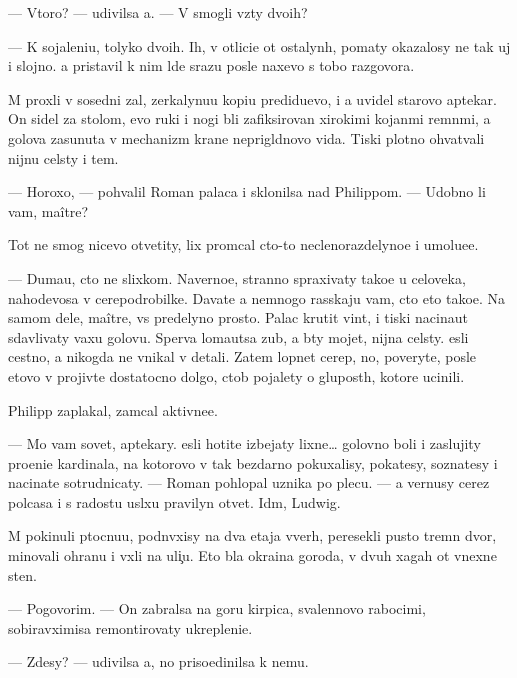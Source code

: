 \documentclass[10pt]{book}
\begin{document}
— Vtoro{\y}? — udivilsa {\y}a. — V{\yi} smogli vz{\ia}ty dvo{\y}ih?

— K sojaleni{\y}u, tolyko dvo{\y}ih. Ih, v otlici{\y}e ot ostalyn{\yi}h, po{\y}maty okazalosy ne tak uj i slojno. {\Y}a pristavil k nim l{\io}de{\y} srazu posle naxevo s tobo{\y} razgovora.

M{\yi} proxli v sosedni{\y} zal, zerkalynu{\y}u kopi{\y}u predidu{\x}evo, i {\y}a uvidel starovo aptekar{\ia}. On sidel za stolom, {\y}evo ruki i nogi b{\yi}li zafiksirovan{\yi} xirokimi kojan{\yi}mi remn{\ia}mi, a golova zasunuta v mechanizm kra{\y}ne neprigl{\ia}dnovo vida. Tiski plotno ohvat{\yi}vali nijn{\io}{\y}u cel{\io}sty i tem{\ia}.

— Horoxo, — pohvalil Roman palaca i sklonilsa nad Philippom. — Udobno li vam, maître?

Tot ne smog nicevo otvetity, lix prom{\yi}cal cto-to neclenorazdelyno{\y}e i umo\-l{\ia}\-{\y}u\-{\x}e\-{\y}e.

— Duma{\y}u, cto ne slixkom. Naverno{\y}e, stranno spraxivaty tako{\y}e u celoveka, nahod{\ia}{\x}evosa v cerepodrobilke. Dava{\y}te {\y}a nemnogo rasskaju vam, cto eto tako{\y}e. Na samom dele, maître, vs{\e} predelyno prosto. Palac krutit vint, i tiski nacina{\y}ut sdavlivaty vaxu golovu. Sperva loma{\y}utsa zub{\yi}, a b{\yi}ty mojet, nijn{\ia}{\y}a cel{\io}sty. {\Y}esli cestno, {\y}a nikogda ne vnikal v detali. Zatem lopnet cerep, no, poveryte, posle etovo v{\yi} projiv{\e}te dostatocno dolgo, ctob{\yi} pojalety o glupost{\ia}h, ko\-to\-r{\yi}\-{\y}e ucinili.

Philipp zaplakal, zam{\yi}cal aktivne{\y}e.

— Mo{\y} vam sovet, aptekary. {\Y}esli hotite izbejaty lixne{\y}… golovno{\y} boli i zaslujity pro{\x}eni{\y}e kardinala, na kotorovo v{\yi} tak bezdarno pokuxalisy, poka{\y}tesy, sozna{\y}tesy i nacina{\y}te sotrudnicaty. — Roman pohlopal uznika po plecu. — {\Y}a vernusy cerez polcasa i s radost{\y}u usl{\yi}xu pravilyn{\yi}{\y} otvet. Id{\e}m, Ludwig.

M{\yi} pokinuli p{\yi}tocnu{\y}u, podn{\ia}vxisy na dva etaja vverh, peresekli pusto{\y} t{\io}rem\-n{\yi}{\y} dvor, minovali ohranu i v{\yi}xli na uli{\c}u. Eto b{\yi}la okra{\y}ina go\-ro\-da, v dvuh xagah ot vnexne{\y} sten{\yi}.

— Pogovorim. — On zabralsa na goru kirpica, svalennovo rabocimi, sobiravximisa remontirovaty ukrepleni{\y}e.

— Zdesy? — udivilsa {\y}a, no priso{\y}edinilsa k nemu.
\end{document}
